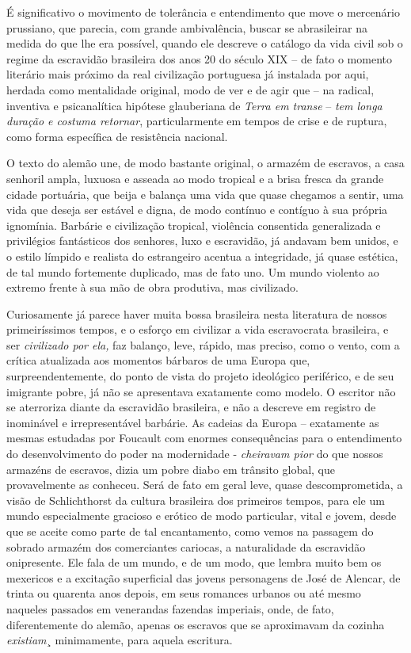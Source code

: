 É significativo o movimento de tolerância e entendimento que move o
mercenário prussiano, que parecia, com grande ambivalência, buscar se
abrasileirar na medida do que lhe era possível, quando ele descreve o
catálogo da vida civil sob o regime da escravidão brasileira dos anos 20
do século XIX -- de fato o momento literário mais próximo da real
civilização portuguesa já instalada por aqui, herdada como mentalidade
original, modo de ver e de agir que -- na radical, inventiva e
psicanalítica hipótese glauberiana de \emph{Terra em transe} --
\emph{tem longa duração e costuma retornar}, particularmente em tempos
de crise e de ruptura, como forma específica de resistência nacional.

O texto do alemão une, de modo bastante original, o armazém de escravos,
a casa senhoril ampla, luxuosa e asseada ao modo tropical e a brisa
fresca da grande cidade portuária, que beija e balança uma vida que
quase chegamos a sentir, uma vida que deseja ser estável e digna, de
modo contínuo e contíguo à sua própria ignomínia. Barbárie e civilização
tropical, violência consentida generalizada e privilégios fantásticos
dos senhores, luxo e escravidão, já andavam bem unidos, e o estilo
límpido e realista do estrangeiro acentua a integridade, já quase
estética, de tal mundo fortemente duplicado, mas de fato uno. Um mundo
violento ao extremo frente à sua mão de obra produtiva, mas civilizado.

Curiosamente já parece haver muita bossa brasileira nesta literatura de
nossos primeiríssimos tempos, e o esforço em civilizar a vida
escravocrata brasileira, e ser \emph{civilizado por ela,} faz balanço,
leve, rápido, mas preciso, como o vento, com a crítica atualizada aos
momentos bárbaros de uma Europa que, surpreendentemente, do ponto de
vista do projeto ideológico periférico, e de seu imigrante pobre, já não
se apresentava exatamente como modelo. O escritor não se aterroriza
diante da escravidão brasileira, e não a descreve em registro de
inominável e irrepresentável barbárie. As cadeias da Europa --
exatamente as mesmas estudadas por Foucault com enormes consequências
para o entendimento do desenvolvimento do poder na modernidade -
\emph{cheiravam pior} do que nossos armazéns de escravos, dizia um pobre
diabo em trânsito global, que provavelmente as conheceu. Será de fato em
geral leve, quase descomprometida, a visão de Schlichthorst da cultura
brasileira dos primeiros tempos, para ele um mundo especialmente
gracioso e erótico de modo particular, vital e jovem, desde que se
aceite como parte de tal encantamento, como vemos na passagem do sobrado
armazém dos comerciantes cariocas, a naturalidade da escravidão
onipresente. Ele fala de um mundo, e de um modo, que lembra muito bem os
mexericos e a excitação superficial das jovens personagens de José de
Alencar, de trinta ou quarenta anos depois, em seus romances urbanos ou
até mesmo naqueles passados em venerandas fazendas imperiais, onde, de
fato, diferentemente do alemão, apenas os escravos que se aproximavam da
cozinha \emph{existiam}¸ minimamente, para aquela escritura.

